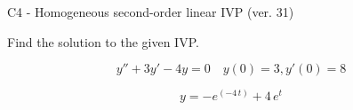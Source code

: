 \begin{exercise}
  \begin{exerciseTitle}C4 - Homogeneous second-order linear IVP (ver. 31)\end{exerciseTitle}
  \begin{exerciseStatement}
    
Find the solution to the given IVP.

    
\[y''+3y'-4y = 0 \hspace{1em} y(0) = 3 , y'(0) = 8\]

  \end{exerciseStatement}
  \begin{exerciseAnswer}
    
\[y= -e^{\left(-4 \, t\right)} + 4 \, e^{t}\]

  \end{exerciseAnswer}
\end{exercise}